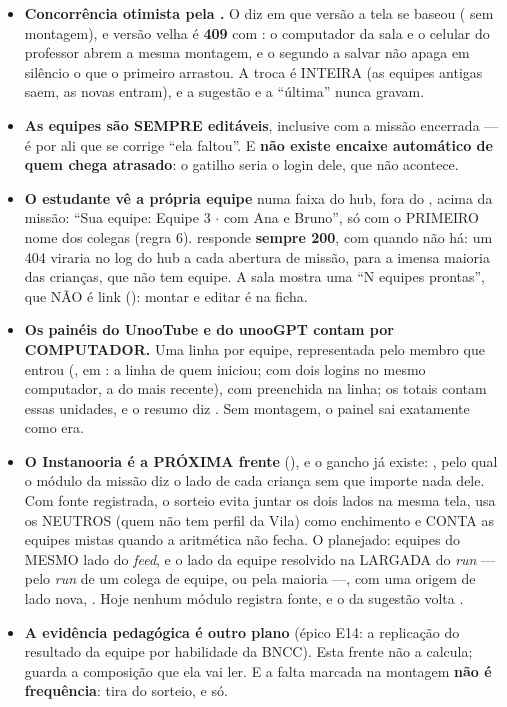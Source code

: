 \begin{itemize}
    um \enquote{sem permissão} já contaria que a turma existe. Gestores e
     só LEEM.
  \item \textbf{Concorrência otimista pela .} O  diz em que
    versão a tela se baseou ( sem montagem), e versão velha é
    \textbf{409} com : o computador da sala e o celular do
    professor abrem a mesma montagem, e o segundo a salvar não apaga em
    silêncio o que o primeiro arrastou. A troca é INTEIRA (as equipes antigas
    saem, as novas entram), e a sugestão e a \enquote{última} nunca gravam.
  \item \textbf{As equipes são SEMPRE editáveis}, inclusive com a missão
    encerrada --- é por ali que se corrige \enquote{ela faltou}. E \textbf{não
    existe encaixe automático de quem chega atrasado}: o gatilho seria o login
    dele, que não acontece.
  \item \textbf{O estudante vê a própria equipe} numa faixa do hub, fora do
    , acima da missão: \enquote{Sua equipe: Equipe 3 $\cdot$ com
    Ana e Bruno}, só com o PRIMEIRO nome dos colegas (regra 6).
     responde \textbf{sempre 200}, com
     quando não há: um 404 viraria  no log do
    hub a cada abertura de missão, para a imensa maioria das crianças, que não
    tem equipe. A sala mostra uma  \enquote{N equipes prontas}, que
    NÃO é link (): montar e editar é na ficha.
  \item \textbf{Os painéis do UnooTube e do unooGPT contam por COMPUTADOR.} Uma
    linha por equipe, representada pelo membro que entrou
    (, em : a linha de quem
    iniciou; com dois logins no mesmo computador, a do mais recente), com
     preenchida na linha; os totais contam essas unidades, e o resumo
    diz . Sem montagem, o painel sai exatamente como era.
  \item \textbf{O Instanooria é a PRÓXIMA frente}
    (), e o gancho já existe:
    , pelo qual o módulo
    da missão diz o lado de cada criança sem que  importe nada
    dele. Com fonte registrada, o sorteio evita juntar os dois lados na mesma
    tela, usa os NEUTROS (quem não tem perfil da Vila) como enchimento e CONTA
    as equipes mistas quando a aritmética não fecha. O planejado: equipes do
    MESMO lado do \emph{feed}, e o lado da equipe resolvido na LARGADA do
    \emph{run} --- pelo \emph{run} de um colega de equipe, ou pela maioria ---,
    com uma origem de lado nova, . Hoje nenhum módulo registra
    fonte, e o  da sugestão volta .
  \item \textbf{A evidência pedagógica é outro plano} (épico E14: a replicação
    do resultado da equipe por habilidade da BNCC). Esta frente não a calcula;
    guarda a composição que ela vai ler. E a falta marcada na montagem
    \textbf{não é frequência}: tira do sorteio, e só.
\end{itemize}

